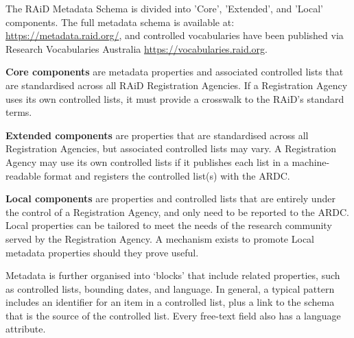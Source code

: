 The RAiD Metadata Schema is divided into 'Core', 'Extended', and 'Local' components. The full metadata schema is available at: \href{https://metadata.raid.org/}{https://metadata.raid.org/}, and controlled vocabularies have been published via Research Vocabularies Australia \href{https://vocabulary.raid.org}{https://vocabularies.raid.org}.

\textbf{Core components} are metadata properties and associated controlled lists that are standardised across all RAiD Registration Agencies. If a Registration Agency uses its own controlled lists, it must provide a crosswalk to the RAiD’s standard terms.

\textbf{Extended components} are properties that are standardised across all Registration Agencies, but associated controlled lists may vary. A Registration Agency may use its own controlled lists if it publishes each list in a machine-readable format and registers the controlled list(s) with the ARDC. 

\textbf{Local components} are properties and controlled lists that are entirely under the control of a Registration Agency, and only need to be reported to the ARDC. Local properties can be tailored to meet the needs of the research community served by the Registration Agency. A mechanism exists to promote Local metadata properties should they prove useful.

Metadata is further organised into ‘blocks’ that include related properties, such as controlled lists, bounding dates, and language. In general, a typical pattern includes an identifier for an item in a controlled list, plus a link to the schema that is the source of the controlled list. Every free-text field also has a language attribute.